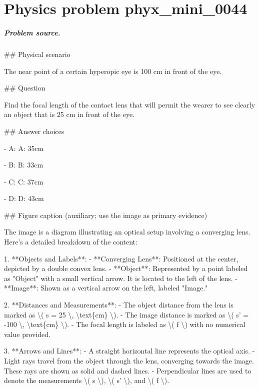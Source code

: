 
\chapter{Physics problem phyx\_mini\_0044}
\label{ch:PhyXMiniProblems_problem_phyx_mini_0044}

\paragraph{Problem source.}
\#\# Physical scenario

The near point of a certain hyperopic eye is 100 cm in front of the eye.

\#\# Question

Find the focal length of the contact lens that will permit the wearer to see clearly an object that is 25 cm in front of the eye.

\#\# Answer choices

- A: A: 35cm

- B: B: 33cm

- C: C: 37cm

- D: D: 43cm

\#\# Figure caption (auxiliary; use the image as primary evidence)

The image is a diagram illustrating an optical setup involving a converging lens. Here's a detailed breakdown of the content:

1. **Objects and Labels**:
   - **Converging Lens**: Positioned at the center, depicted by a double convex lens.
   - **Object**: Represented by a point labeled as "Object" with a small vertical arrow. It is located to the left of the lens.
   - **Image**: Shown as a vertical arrow on the left, labeled "Image."

2. **Distances and Measurements**:
   - The object distance from the lens is marked as \textbackslash{}( s = 25 \textbackslash{}, \textbackslash{}text\{cm\} \textbackslash{}).
   - The image distance is marked as \textbackslash{}( s' = -100 \textbackslash{}, \textbackslash{}text\{cm\} \textbackslash{}).
   - The focal length is labeled as \textbackslash{}( f \textbackslash{}) with no numerical value provided.

3. **Arrows and Lines**:
   - A straight horizontal line represents the optical axis.
   - Light rays travel from the object through the lens, converging towards the image. These rays are shown as solid and dashed lines.
   - Perpendicular lines are used to denote the measurements \textbackslash{}( s \textbackslash{}), \textbackslash{}( s' \textbackslash{}), and \textbackslash{}( f \textbackslash{}).

